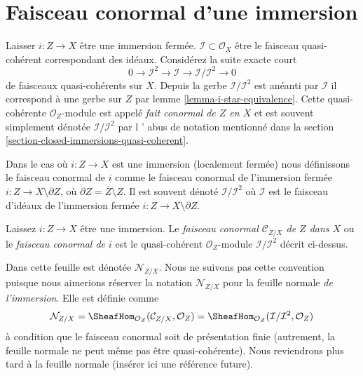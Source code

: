 \section{Faisceau conormal d'une immersion}
\label{section-conormal-sheaf}

\noindent

Laisser $i : Z \to X$ être une immersion fermée.
$\mathcal{I} \subset \mathcal{O}_X$ être le faisceau quasi-cohérent correspondant des idéaux. Considérez la suite exacte court
$$
0 \to \mathcal{I}^2 \to \mathcal{I} \to \mathcal{I}/\mathcal{I}^2 \to 0
$$
de faisceaux quasi-cohérents sur $X$. Depuis la gerbe $\mathcal{I}/\mathcal{I}^2$
est anéanti par $\mathcal{I}$ il correspond à une gerbe sur $Z$ par lemme \ref{lemma-i-star-equivalence}. Cette quasi-cohérente
$\mathcal{O}_Z$-module est appelé {\it fait conormal de $Z$ en $X$} et est souvent simplement dénotée
$\mathcal{I}/\mathcal{I}^2$ par l ' abus de notation mentionné dans la section \ref{section-closed-immersions-quasi-coherent}.

\medskip\noindent
Dans le cas où $i : Z \to X$ est une immersion (localement fermée) nous définissons le faisceau conormal de $i$ comme le faisceau conormal de l'immersion fermée $i : Z \to X \setminus \partial Z$, où $\partial Z = \overline{Z} \setminus Z$. Il est souvent dénoté $\mathcal{I}/\mathcal{I}^2$ où $\mathcal{I}$ est le faisceau d'idéaux de l'immersion fermée $i : Z \to X \setminus \partial Z$.

\begin{definition}

\label{definition-conormal-sheaf}
Laissez $i : Z \to X$ être une immersion. Le {\it faisceau conormal $\mathcal{C}_{Z/X}$ de $Z$ dans $X$} ou le {\it faisceau conormal de $i$} est le quasi-cohérent $\mathcal{O}_Z$-module $\mathcal{I}/\mathcal{I}^2$ décrit ci-dessus.
\end{definition}

\noindent
Dans \cite[IV définition 16.1.2]{EGA} cette feuille est dénotée $\mathcal{N}_{Z/X}$. Nous ne suivons pas cette convention puisque nous aimerions réserver la notation $\mathcal{N}_{Z/X}$ pour la feuille normale {\it de l'immersion}. Elle est définie comme $$
\mathcal{N}_{Z/X} =
\SheafHom_{\mathcal{O}_Z}(\mathcal{C}_{Z/X}, \mathcal{O}_Z) =
\SheafHom_{\mathcal{O}_Z}(\mathcal{I}/\mathcal{I}^2, \mathcal{O}_Z)
$$ à condition que le faisceau conormal soit de présentation finie (autrement, la feuille normale ne peut même pas être quasi-cohérente). Nous reviendrons plus tard à la feuille normale (insérer ici une référence future).

